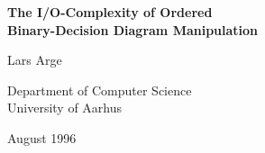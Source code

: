 \documentclass[english, aspectratio=169]{beamer}
\begin{document}
%
%
%
%
\begin{frame}[label=timeline]
  \begin{center}
    \begin{tikzpicture}
      
    \end{tikzpicture}
  \end{center}
\end{frame}



\blankframe

\begin{frame}
  \begin{center}
    {\Large\bf The I/O-Complexity of Ordered\\Binary-Decision Diagram Manipulation}

    Lars Arge

    {\footnotesize Department of Computer Science\\University of Aarhus}

    {\footnotesize August 1996}
  \end{center}
\end{frame}
\end{document}
